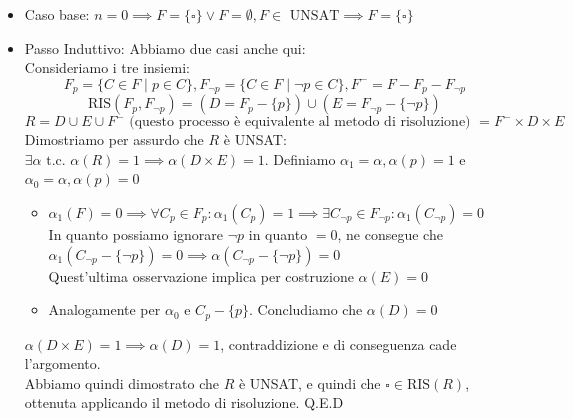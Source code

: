 \documentclass{report}
\begin{document}
                \begin{itemize}
                    \item Caso base: $n = 0 \implies F = \{\square\} \vee F = \emptyset, 
                        F \in \textrm{ UNSAT} \implies F = \{\square\}$
                    \item Passo Induttivo: Abbiamo due casi anche qui: \\
                        Consideriamo i tre insiemi:
                        $$F_p = \{C \in F \mid p \in C\}, F_{\neg p} = \{C \in F \mid \neg p \in C\}, F^- = F - F_p - F_{\neg p}$$
                        $$\textrm{RIS}\left(F_p, F_{\neg p}\right) = \left(D = F_p - \{p\}\right) \cup \left(E = F_{\neg p} - \{\neg p\}\right)$$
                        $$R = D \cup E \cup F^- \textrm{ (questo processo è equivalente al metodo di risoluzione) } = F^- \times D \times E$$
                        Dimostriamo per assurdo che $R$ è UNSAT: \\
                        $\exists \alpha \textrm{ t.c. } \alpha\left(R\right) = 1 \implies \alpha\left(D \times E\right) = 1$.
                        Definiamo $\alpha_1 = \alpha, \alpha\left(p\right) = 1$ e $\alpha_0 = \alpha, \alpha\left(p\right) = 0$ \\
                        \begin{itemize}
                            \item $\alpha_1\left(F\right) = 0 \implies \forall C_p \in F_p: \alpha_1\left(C_p\right) = 1 \implies 
                                \exists C_{\neg p} \in F_{\neg p}: \alpha_1\left(C_{\neg p}\right) = 0$ \\
                                In quanto possiamo ignorare $\neg p$ in quanto $= 0$, ne consegue che 
                                $\alpha_1\left(C_{\neg p} - \{\neg p\}\right) = 0 \implies \alpha\left(C_{\neg p} - \{\neg p\}\right) = 0$ \\
                                Quest'ultima osservazione implica per costruzione $\alpha\left(E\right) = 0$
                            \item Analogamente per $\alpha_0$ e $C_p - \{p\}$. Concludiamo che $\alpha\left(D\right) = 0$
                        \end{itemize}
                        $\alpha\left(D \times E\right) = 1 \implies \alpha\left(D\right) = 1$, contraddizione e di conseguenza cade l'argomento. \\
                        Abbiamo quindi dimostrato che $R$ è UNSAT, e quindi che $\square \in \textrm{RIS}\left(R\right)$, 
                        ottenuta applicando il metodo di risoluzione. Q.E.D
                \end{itemize}
\end{document}
